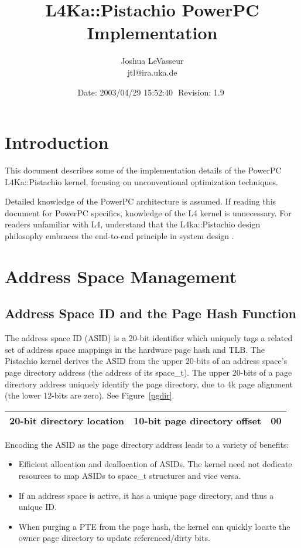 \documentclass[a4paper]{article}
\author{Joshua LeVasseur \\ {\normalsize{\textsf{jtl@ira.uka.de}}} }
\title{L4Ka::Pistachio PowerPC Implementation}
\date{ $ $Date: 2003/04/29 15:52:40 $ $ $ $Revision: 1.9 $ $ }
\newcommand{\code}[1]{\textsf{#1}}
\begin{document}
\maketitle
\tableofcontents


\section{Introduction}
This document describes some of the implementation details of the PowerPC
L4Ka::Pistachio kernel, focusing on unconventional optimization techniques.

Detailed knowledge of the PowerPC architecture \cite{ppc32} is assumed.  
If reading this document for PowerPC specifics, knowledge of the L4 kernel is 
unnecessary.
For readers unfamiliar with L4, understand that the L4ka::Pistachio 
\cite{l4X2refdoc} design 
philosophy embraces the end-to-end principle in system design
\cite{saltzer84endtoend}.


\section{Address Space Management}

\subsection{Address Space ID and the Page Hash Function}
The address space ID (ASID) is a 20-bit identifier which uniquely tags a 
related set of address space mappings in the hardware page hash and TLB.  
The Pistachio kernel derives the ASID from the upper 20-bits of an address 
space's page directory address (the address of its \code{space\_t}).  
The upper 20-bits of a page directory address uniquely identify the page
directory, due to 4k page alignment (the lower
12-bits are zero).  See Figure~\ref{pgdir}.

\begin{figure*}[htb]
\begin{center}
\begin{tabular}{|c|c|c|} \hline
20-bit directory location & 10-bit page directory offset & 00 \\ \hline
\end{tabular}
\end{center}
\caption{The page directory address.}
\label{pgdir}
\end{figure*}

Encoding the ASID as the page directory address leads to a variety of 
benefits:
\begin{itemize}
\item Efficient allocation and deallocation of ASIDs.  The kernel
      need not dedicate resources to map ASIDs to \code{space\_t} structures
      and vice versa.
\item If an address space is active, it has a unique page directory, and thus
      a unique ID.
\item When purging a PTE from the page hash, the kernel can quickly locate 
      the owner page directory to update referenced/dirty bits.
\end{itemize}
\end{document}
